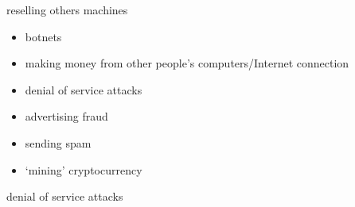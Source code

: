 \begin{frame}{reselling others machines}
    \begin{itemize}
    \item botnets
    \vspace{.5cm}
    \item making money from other people's computers/Internet connection
    \item denial of service attacks
    \item advertising fraud
    \item sending spam
    \item `mining' cryptocurrency
    \end{itemize}
\end{frame}


{ %
    \begin{frame}{denial of service attacks}
    \end{frame}
}
        

